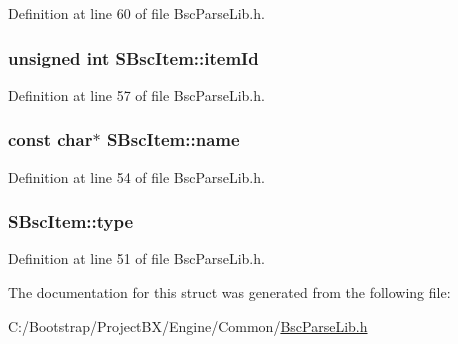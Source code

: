 Definition at line 60 of file BscParseLib.h.\hypertarget{struct_s_bsc_item_eeee5502b47e2983493a094bd2b90e50}{
\subsubsection[{itemId}]{\setlength{\rightskip}{0pt plus 5cm}unsigned int {\bf SBscItem::itemId}}}
\label{struct_s_bsc_item_eeee5502b47e2983493a094bd2b90e50}




Definition at line 57 of file BscParseLib.h.\hypertarget{struct_s_bsc_item_d041cf6e983e48f09227b82c1709ffe7}{
\subsubsection[{name}]{\setlength{\rightskip}{0pt plus 5cm}const char$\ast$ {\bf SBscItem::name}}}
\label{struct_s_bsc_item_d041cf6e983e48f09227b82c1709ffe7}




Definition at line 54 of file BscParseLib.h.\hypertarget{struct_s_bsc_item_b676ba2550ae03c2b67579c7e48969b6}{
\subsubsection[{type}]{ {\bf SBscItem::type}}}
\label{struct_s_bsc_item_b676ba2550ae03c2b67579c7e48969b6}




Definition at line 51 of file BscParseLib.h.

The documentation for this struct was generated from the following file:\begin{CompactItemize}
\item 
C:/Bootstrap/ProjectBX/Engine/Common/\hyperlink{_bsc_parse_lib_8h}{BscParseLib.h}\end{CompactItemize}
